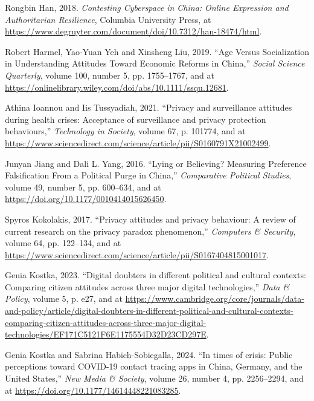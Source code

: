 \documentclass[
  letterpaper,
  DIV=11,
  numbers=noendperiod]{scrartcl}
\newlength{\cslhangindent}
\newenvironment{CSLReferences}[2] %
 {\begin{list}{}{%
  \setlength{\itemindent}{0pt}
  \setlength{\leftmargin}{0pt}
  \setlength{\parsep}{0pt}
  \ifodd #1
   \setlength{\leftmargin}{\cslhangindent}
   \setlength{\itemindent}{-1\cslhangindent}
  \fi
  \setlength{\itemsep}{#2\baselineskip}}}
 {\end{list}}
\begin{document}
\begin{CSLReferences}{1}{1}
Rongbin Han, 2018. \emph{Contesting Cyberspace in China: Online
Expression and Authoritarian Resilience}, Columbia University Press, at
\url{https://www.degruyter.com/document/doi/10.7312/han-18474/html}.

Robert Harmel, Yao-Yuan Yeh and Xinsheng Liu, 2019. {``Age Versus
Socialization in Understanding Attitudes Toward Economic Reforms in
China,''} \emph{Social Science Quarterly}, volume 100, number 5, pp.
1755--1767, and at
\url{https://onlinelibrary.wiley.com/doi/abs/10.1111/ssqu.12681}.

Athina Ioannou and Iis Tussyadiah, 2021. {``Privacy and surveillance
attitudes during health crises: Acceptance of surveillance and privacy
protection behaviours,''} \emph{Technology in Society}, volume 67, p.
101774, and at
\url{https://www.sciencedirect.com/science/article/pii/S0160791X21002499}.

Junyan Jiang and Dali L. Yang, 2016. {``Lying or Believing? Measuring
Preference Falsification From a Political Purge in China,''}
\emph{Comparative Political Studies}, volume 49, number 5, pp. 600--634,
and at \url{https://doi.org/10.1177/0010414015626450}.

Spyros Kokolakis, 2017. {``Privacy attitudes and privacy behaviour: A
review of current research on the privacy paradox phenomenon,''}
\emph{Computers \& Security}, volume 64, pp. 122--134, and at
\url{https://www.sciencedirect.com/science/article/pii/S0167404815001017}.

Genia Kostka, 2023. {``Digital doubters in different political and
cultural contexts: Comparing citizen attitudes across three major
digital technologies,''} \emph{Data \& Policy}, volume 5, p. e27, and at
\url{https://www.cambridge.org/core/journals/data-and-policy/article/digital-doubters-in-different-political-and-cultural-contexts-comparing-citizen-attitudes-across-three-major-digital-technologies/EF171C5121F6E1175554D32D23CD297E}.

Genia Kostka and Sabrina Habich-Sobiegalla, 2024. {``In times of crisis:
Public perceptions toward COVID-19 contact tracing apps in China,
Germany, and the United States,''} \emph{New Media \& Society}, volume
26, number 4, pp. 2256--2294, and at
\url{https://doi.org/10.1177/14614448221083285}.


\end{CSLReferences}
\end{document}
